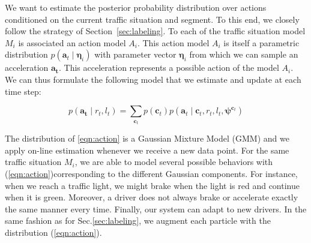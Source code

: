 We want to estimate the posterior probability distribution over actions
conditioned on the current traffic situation and segment. To this end, we
closely follow the strategy of Section~\ref{sec:labeling}. To each of the
traffic situation model $M_i$ is associated an action model $A_i$. This action
model $A_i$ is itself a parametric distribution $p(\mathbf{a}_t\mid
\boldsymbol{\eta}_i)$ with parameter vector $\boldsymbol{\eta}_i$ from which we
can sample an acceleration $\mathbf{a_t}$. This acceleration represents a
possible action of the model $A_i$. We can thus formulate the following model
that we estimate and update at each time step:

\begin{equation}
\label{eqn:action}
p(\mathbf{a_t} \mid r_t, l_t)=\sum_{\mathbf{c}_t} p(\mathbf{c}_t)p(\mathbf{a}_t\mid\mathbf{c}_t,r_t,l_t,\boldsymbol{\psi}^{\mathbf{c}_t})
\end{equation}

The distribution of \eqref{eqn:action} is a Gaussian Mixture Model (GMM) and
we apply on-line estimation whenever we receive a new data point. For the same
traffic situation $M_i$, we are able to model several possible behaviors
with (\ref{eqn:action})corresponding to the different Gaussian components. For
instance, when we reach a traffic light, we might brake when the light is red
and continue when it is green. Moreover, a driver does not always brake or
accelerate exactly the same manner every time. Finally, our system can adapt
to new drivers. In the same fashion as for Sec.\ref{sec:labeling}, we augment
each particle with the distribution (\ref{eqn:action}).
